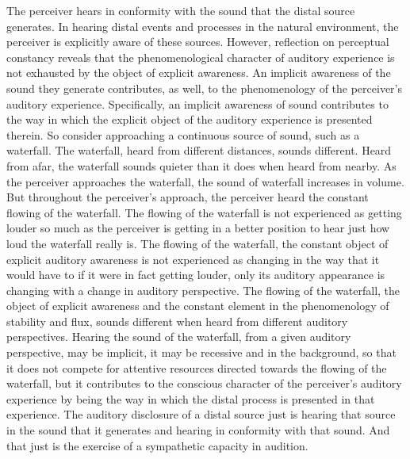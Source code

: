 The perceiver hears in conformity with the sound that the distal source generates. In hearing distal events and processes in the natural environment, the perceiver is explicitly aware of these sources. However, reflection on perceptual constancy reveals that the phenomenological character of auditory experience is not exhausted by the object of explicit awareness. An implicit awareness of the sound they generate contributes, as well, to the phenomenology of the perceiver's auditory experience. Specifically, an implicit awareness of sound contributes to the way in which the explicit object of the auditory experience is presented therein. So consider approaching a continuous source of sound, such as a waterfall. The waterfall, heard from different distances, sounds different. Heard from afar, the waterfall sounds quieter than it does when heard from nearby. As the perceiver approaches the waterfall, the sound of waterfall increases in volume. But throughout the perceiver's approach, the perceiver heard the constant flowing of the waterfall. The flowing of the waterfall is not experienced as getting louder so much as the perceiver is getting in a better position to hear just how loud the waterfall really is. The flowing of the waterfall, the constant object of explicit auditory awareness is not experienced as changing in the way that it would have to if it were in fact getting louder, only its auditory appearance is changing with a change in auditory perspective. The flowing of the waterfall, the object of explicit awareness and the constant element in the phenomenology of stability and flux, sounds different when heard from different auditory perspectives. Hearing the sound of the waterfall, from a given auditory perspective, may be implicit, it may be recessive and in the background, so that it does not compete for attentive resources directed towards the flowing of the waterfall, but it contributes to the conscious character of the perceiver's auditory experience by being the way in which the distal process is presented in that experience. The auditory disclosure of a distal source just is hearing that source in the sound that it generates and hearing in conformity with that sound. And that just is the exercise of a sympathetic capacity in audition.

